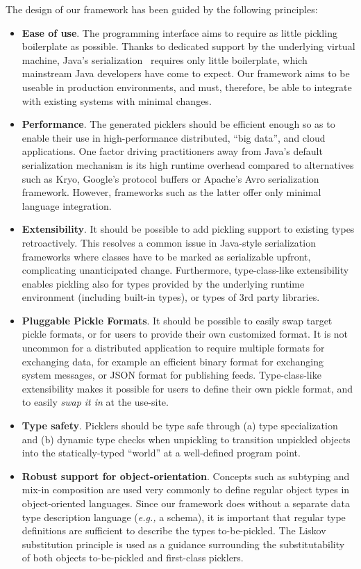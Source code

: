 \documentclass[preprint,10pt]{sigplanconf}
\theoremstyle{definition}
\theoremstyle{definition}
\begin{document}
The design of our framework has been guided by the following principles:
\begin{itemize}
\item {\bf Ease of use}. The programming interface aims to require as little
pickling boilerplate as possible. Thanks to dedicated support by the
underlying virtual machine, Java's serialization~\cite{JavaSerialization}
requires only little boilerplate, which mainstream Java developers have come
to expect. Our framework aims to be useable in production environments, and
must, therefore, be able to integrate with existing systems with minimal
changes.

\item {\bf Performance}. The generated picklers should be efficient enough  so
as to enable their use in high-performance distributed, ``big data'', and
cloud applications. One factor driving practitioners away from Java's default
serialization mechanism is its high runtime overhead compared to alternatives
such as Kryo, Google's protocol buffers or Apache's Avro serialization
framework. However, frameworks such as the latter offer only minimal language
integration.

\item {\bf Extensibility}. It should be possible to add pickling support to existing
types retroactively. This resolves a common issue in Java-style serialization
frameworks where classes have to be marked as serializable upfront,
complicating unanticipated change. Furthermore, type-class-like extensibility
enables pickling also for types provided by the underlying runtime environment
(including built-in types), or types of 3rd party libraries.

\item {\bf Pluggable Pickle Formats}. It should be possible to easily swap target
pickle formats, or for users to provide their own customized format. It is not
uncommon for a distributed application to require multiple formats for
exchanging data, for example an efficient binary format for exchanging system
messages, or JSON format for publishing feeds. Type-class-like extensibility
makes it possible for users to define their own pickle format, and to easily
{\em swap it in} at the use-site.

\item {\bf Type safety}. Picklers should be type safe through (a) type
specialization and (b) dynamic type checks when unpickling to transition
unpickled objects into the statically-typed ``world'' at a well-defined program
point.

\item {\bf Robust support for object-orientation}. Concepts such as subtyping and
mix-in composition are used very commonly to define regular object types in
object-oriented languages. Since our framework does without a separate data
type description language ({\em e.g.,} a schema), it is important that regular
type definitions are sufficient to describe the types to-be-pickled. The
Liskov substitution principle is used as a guidance surrounding the
substitutability of both objects to-be-pickled and first-class picklers.
\end{itemize}
\end{document}
